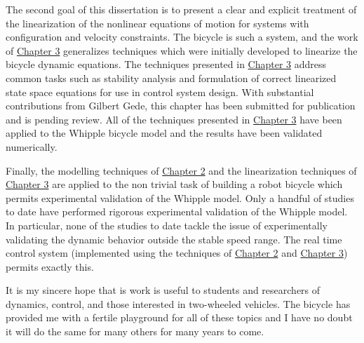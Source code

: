 The second goal of this dissertation is to present a clear and explicit
treatment of the linearization of the nonlinear equations of motion for systems
with configuration and velocity constraints. The bicycle is such a system, and
the work of \hyperref[chapter3]{Chapter 3} generalizes techniques which were
initially developed to linearize the bicycle dynamic equations. The techniques
presented in \hyperref[chapter3]{Chapter 3} address common tasks such as
stability analysis and formulation of correct linearized state space equations
for use in control system design. With substantial contributions from Gilbert
Gede, this chapter has been submitted for publication and is pending review.
All of the techniques presented in \hyperref[chapter3]{Chapter 3} have been
applied to the Whipple bicycle model and the results have been validated
numerically.

Finally, the modelling techniques of \hyperref[chapter2]{Chapter 2} and the
linearization techniques of \hyperref[chapter3]{Chapter 3} are applied to the
non trivial task of building a robot bicycle which permits experimental
validation of the Whipple model. Only a handful of studies to date have
performed rigorous experimental validation of the Whipple model. In particular,
none of the studies to date tackle the issue of experimentally validating the
dynamic behavior outside the stable speed range. The real time control system
(implemented using the techniques of \hyperref[chapter2]{Chapter 2} and
\hyperref[chapter3]{Chapter 3}) permits exactly this.

It is my sincere hope that is work is useful to students and researchers of
dynamics, control, and those interested in two-wheeled vehicles. The bicycle
has provided me with a fertile playground for all of these topics and I have no
doubt it will do the same for many others for many years to come.
